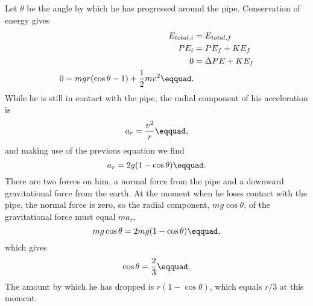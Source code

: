 Let $\theta$ be the angle by which he has
progressed around the pipe. Conservation of energy gives
\begin{align*}
		E_{total,i}	 &=    E_{total,f}  \\
         	PE_i		 &=    PE_f+ KE_f   \\
         	0		 &=    \Delta PE+ KE_f  \\
		0		 =    mgr(\cos  \theta -1) +  \frac{1}{2}mv^2\eqquad.  
\end{align*}
While he is still in contact with the pipe, the radial
component of his acceleration is
\begin{equation*}
		a_r		 =    \frac{v^2}{r}\eqquad,  
\end{equation*}
and making use of the previous equation we find
\begin{equation*}
		a_r		 =    2g(1-\cos  \theta )\eqquad.  
\end{equation*}
There are two forces on him, a normal force from the pipe
and a downward gravitational force from the earth. At the
moment when he loses contact with the pipe, the normal
force is zero, so the radial component, 
$mg \cos\theta$, of the gravitational force must equal $ma_r$,
\begin{equation*}
  mg \cos  \theta = 2mg(1-\cos\theta)\eqquad,  
\end{equation*}
which gives
\begin{equation*}
		\cos  \theta 	 =    \frac{2}{3}\eqquad.  
\end{equation*}
The amount by which he has dropped is $r(1-\cos\theta)$,
which equals $r/3$ at this moment.
